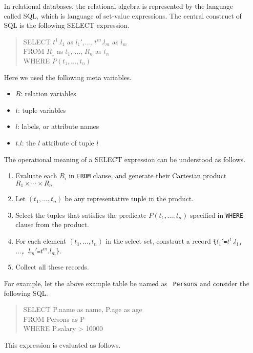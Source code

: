 \documentclass{jbook}
\newenvironment{program}{\begin{tt}\begin{quote}}{\end{quote}\end{tt}}
\begin{document}
	In relational databases, the relational algebra is represented
by the language called SQL, which is language of set-value expressions.
	The central construct of SQL is the following SELECT expression.
\begin{program}
SELECT $t^1.l_1$ as $l_1'$,$\ldots$, $t^m.l_m$ as $l_m$\\
FROM $R_1$ as $t_1$, $\ldots$, $R_n$ as $t_n$\\
WHERE $P(t_1,\ldots, t_n)$
\end{program}
	Here we used the following meta variables.
\begin{itemize}
\item $R$: relation variables
\item $t$: tuple variables
\item $l$: labels, or attribute names
\item $t.l$: the $l$ attribute of tuple $l$
\end{itemize}
	The operational meaning of a SELECT expression can be understood
as follows.
\begin{enumerate}
\item Evaluate each $R_i$ in {\tt FROM} clause, and generate their Cartesian product
$
R_1 \times \cdots \times R_n
$
\item Let $(t_1,\ldots,t_n)$ be any representative tuple in the product.
\item Select the tuples that satisfies the predicate $P(t_1,\ldots,t_n)$
specified in {\tt WHERE} clause from the product.
\item
	For each element $(t_1,\ldots,t_n)$ in the select set, construct
a record  {\tt \{$l_1'$=$t^1.l_1$, $\ldots$, $l_m'$=$t^m.l_m$\}}.

\item Collect all these records.
\end{enumerate}
	For example, let the above example table be named as {\tt
Persons} and consider the following SQL.
\begin{program}
SELECT P.name as name, P.age as age\\
FROM Persons as P\\
WHERE P.salary > 10000
\end{program}
	This expression is evaluated as follows.
\end{document}
